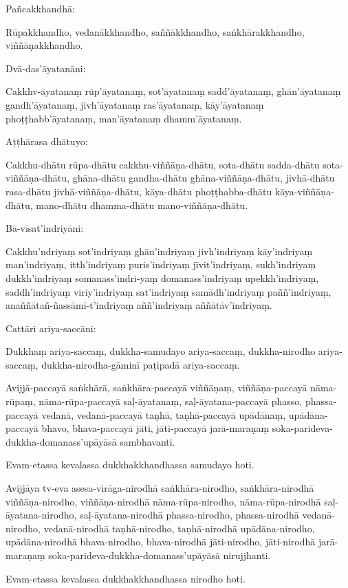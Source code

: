 
Pañcakkhandhā:

Rūpakkhandho, vedanākkhandho, saññākkhandho, saṅkhārakkhandho,
viññāṇakkhandho.

Dvā-das'āyatanāni:

Cakkhv-āyatanaṃ rūp'āyatanaṃ, sot'āyatanaṃ sadd'āyatanaṃ, ghān'āyatanaṃ
gandh'āyatanaṃ, jivh'āyatanaṃ ras'āyatanaṃ, kāy'āyatanaṃ
phoṭṭhabb'āyatanaṃ, man'āyatanaṃ dhamm'āyatanaṃ.

Aṭṭhārasa dhātuyo:

Cakkhu-dhātu rūpa-dhātu cakkhu-viññāṇa-dhātu, sota-dhātu sadda-dhātu
sota-viññāṇa-dhātu, ghāna-dhātu gandha-dhātu ghāna-viññāṇa-dhātu,
jivhā-dhātu rasa-dhātu jivhā-viññāṇa-dhātu, kāya-dhātu phoṭṭhabba-dhātu
kāya-viññāṇa-dhātu, mano-dhātu dhamma-dhātu mano-viññāṇa-dhātu.

Bā-vīsat'indriyāni:

Cakkhu'ndriyaṃ sot'indriyaṃ ghān'indriyaṃ jivh'indriyaṃ kāy'indriyaṃ
man'indriyaṃ, itth'indriyaṃ puris'indriyaṃ jīvit'indriyaṃ, sukh'indriyaṃ
dukkh'indriyaṃ somanass'indri-yaṃ domanass'indriyaṃ upekkh'indriyaṃ,
saddh'indriyaṃ viriy'indriyaṃ sat'indriyaṃ samādh'indriyaṃ
paññ'indriyaṃ, anaññātañ-ñassāmī-t'indriyaṃ aññ'indriyaṃ
aññātāv'indriyaṃ.

\enlargethispage{\baselineskip}

Cattāri ariya-saccāni:

Dukkhaṃ ariya-saccaṃ, dukkha-samudayo ariya-saccaṃ, dukkha-nirodho
ariya-saccaṃ, dukkha-nirodha-gāminī paṭipadā ariya-saccaṃ.

Avijjā-paccayā saṅkhārā, saṅkhāra-paccayā viññāṇaṃ, viññāṇa-paccayā
nāma-rūpaṃ, nāma-rūpa-paccayā saḷ-āyatanaṃ, saḷ-āyatana-paccayā phasso,
phassa-paccayā vedanā, vedanā-paccayā taṇhā, taṇhā-paccayā upādānaṃ,
upādāna-paccayā bhavo, bhava-paccayā jāti, jāti-paccayā jarā-maraṇaṃ
soka-parideva-dukkha-domanass'upāyāsā sambhavanti.

Evam-etassa kevalassa dukkhakkhandhassa samudayo hoti.

Avijjāya tv-eva asesa-virāga-nirodhā saṅkhāra-nirodho, saṅkhāra-nirodhā
viññāṇa-nirodho, viññāṇa-nirodhā nāma-rūpa-nirodho, nāma-rūpa-nirodhā
saḷ-āyatana-nirodho, saḷ-āyatana-nirodhā phassa-nirodho, phassa-nirodhā
vedanā-nirodho, vedanā-nirodhā taṇhā-nirodho, taṇhā-nirodhā
upādāna-nirodho, upādāna-nirodhā bhava-nirodho, bhava-nirodhā
jāti-nirodho, jāti-nirodhā jarā-maraṇaṃ
soka-parideva-dukkha-domanass'upāyāsā nirujjhanti.

Evam-etassa kevalassa dukkhakkhandhassa nirodho hoti.

